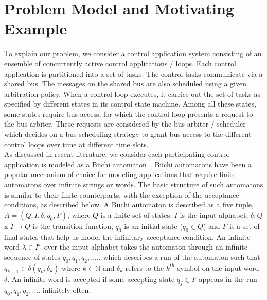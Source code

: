 \section{Problem Model and Motivating Example} \label{sec3}
\noindent
To explain our problem, we consider a control application system consisting of an ensemble of concurrently active control applications / loops. Each control application is partitioned into a set of
tasks. The control tasks communicate via a shared bus. The messages on the shared bus are also scheduled using a given arbitration policy. When a control loop executes, it carries out the set of tasks as specified by different states in its control state machine. Among all these states, some
states require bus access, for which the control loop presents a request to the bus arbiter. These requests are considered by the bus arbiter / scheduler which decides on a bus scheduling strategy to grant bus access to the different control loops over time at different time slots. \\

\noindent
As discussed in recent literature, we consider each participating control application is modeled as a B\"{u}chi automaton~\cite{leeuwen90/Thomas90}. B\"{u}chi automatons have been a popular mechanism of choice for modeling applications that require finite automatons over infinite strings or words. The basic structure of such automatons is similar to their finite counterparts, with the exception of the acceptance conditions, as described below.
A B\"{u}chi automaton is described as a five tuple, 
$A = (Q,I,\delta,q_0,F)$, where $Q$ is a finite set of states, $I$ is the input alphabet, $\delta : Q$ x $I \rightarrow Q $ is the transition function, $q_0$ 
is an initial state ($q_0 \in Q$) and $F$ is a set of final states that help us model the infinitary acceptance condition. An infinite word $\lambda \in I ^ \omega$ over the input alphabet takes the automaton through an infinite sequence of states $ q_0, q_1, q_2, ....$, which describes a run of
the automaton such that $ q_{k+1} \in \delta(q_k, \delta_k)$ where $k \in \mathbb{N}$ and $\delta_k$ refers to the $k^{th}$ symbol on the input 
word $\delta$. An infinite word is accepted if some 
accepting state $q_f \in F $ appears in the run $ q_0, q_1, q_2, ....$ 
infinitely often. \\

